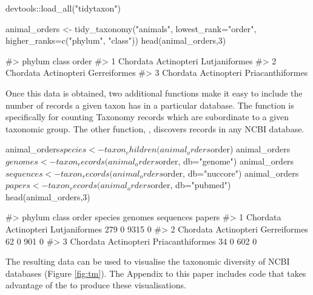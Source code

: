 \begin{example}
devtools::load_all("tidytaxon")

animal_orders <- tidy_taxonomy("animals", 
                               lowest_rank="order",
                               higher_ranks=c("phylum", "class"))
head(animal_orders,3)

#>     phylum       class            order
#> 1 Chordata Actinopteri    Lutjaniformes
#> 2 Chordata Actinopteri     Gerreiformes
#> 3 Chordata Actinopteri Priacanthiformes
\end{example}

Once this data is obtained, two additional functions make it easy to include the
number of records a given taxon has in a particular database. The function
 is specifically for counting Taxonomy records which are
subordinate to a given taxonomic group. The other function,  , 
discovers records in any NCBI database.

\begin{example}
animal_orders$species <- taxon_children(animal_orders$order)
animal_orders$genomes <- taxon_records(animal_orders$order, db="genome")
animal_orders$sequences <- taxon_records(animal_orders$order, db="nuccore")
animal_orders$papers <- taxon_records(animal_orders$order, db="pubmed")
head(animal_orders,3)

#>     phylum       class            order species genomes sequences papers
#> 1 Chordata Actinopteri    Lutjaniformes     279       0      9315      0
#> 2 Chordata Actinopteri     Gerreiformes      62       0       901      0
#> 3 Chordata Actinopteri Priacanthiformes      34       0       602      0
\end{example}

The resulting data can be used to visualise the taxonomic diversity of NCBI 
databases (Figure \ref{fig:tm}). The Appendix to this paper 
includes code that takes advantage of the  \citep{treemap} to 
produce these visualisations. 

